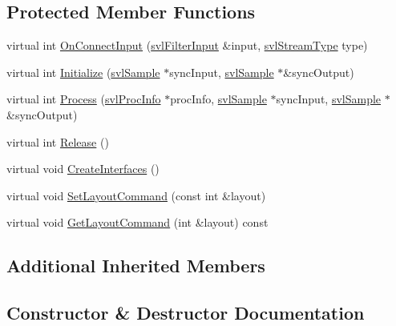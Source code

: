 \subsection*{Protected Member Functions}
\begin{DoxyCompactItemize}
\item 
virtual int \hyperlink{classsvl_filter_stereo_image_joiner_a07fe73ef7791be2fa14d830af1486106}{On\+Connect\+Input} (\hyperlink{classsvl_filter_input}{svl\+Filter\+Input} \&input, \hyperlink{svl_definitions_8h_aa00696d338a58db361335a01fd11e122}{svl\+Stream\+Type} type)
\item 
virtual int \hyperlink{classsvl_filter_stereo_image_joiner_adf15090abfb5e330f0e7694c79cefa33}{Initialize} (\hyperlink{classsvl_sample}{svl\+Sample} $\ast$sync\+Input, \hyperlink{classsvl_sample}{svl\+Sample} $\ast$\&sync\+Output)
\item 
virtual int \hyperlink{classsvl_filter_stereo_image_joiner_af8fa25f725e5f90e71df4b54fd584b55}{Process} (\hyperlink{structsvl_proc_info}{svl\+Proc\+Info} $\ast$proc\+Info, \hyperlink{classsvl_sample}{svl\+Sample} $\ast$sync\+Input, \hyperlink{classsvl_sample}{svl\+Sample} $\ast$\&sync\+Output)
\item 
virtual int \hyperlink{classsvl_filter_stereo_image_joiner_a3b66546391f6866904cb328c3034d041}{Release} ()
\item 
virtual void \hyperlink{classsvl_filter_stereo_image_joiner_afed4e6bca724f7f61cc81a83b9c74160}{Create\+Interfaces} ()
\item 
virtual void \hyperlink{classsvl_filter_stereo_image_joiner_a21f7419df96a7335fcb99831fe163895}{Set\+Layout\+Command} (const int \&layout)
\item 
virtual void \hyperlink{classsvl_filter_stereo_image_joiner_aada6526253852cf7dd60ec592d932c2c}{Get\+Layout\+Command} (int \&layout) const 
\end{DoxyCompactItemize}
\subsection*{Additional Inherited Members}


\subsection{Constructor \& Destructor Documentation}
\hypertarget{classsvl_filter_stereo_image_joiner_adfbcbdb5c5e39970f8782a53ed344925}{}
